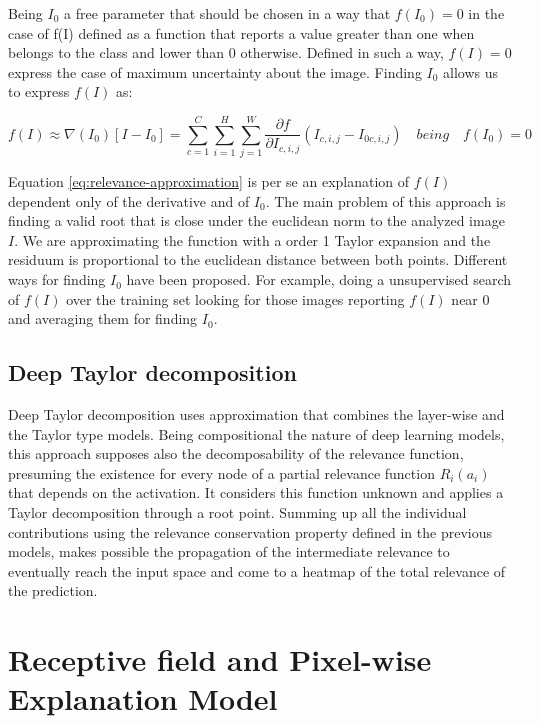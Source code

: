 \documentclass[preprint]{elsarticle}
\theoremstyle{definition} %
\theoremstyle{remark}
\begin{document}
Being $I_0$ a free parameter that should be chosen in a way that $f(I_0) = 0$ in the case of f(I) defined as a function that reports a value greater than one when belongs to the class and lower than 0 otherwise. Defined in such a way, $f(I) = 0$ express the case of maximum uncertainty about the image. Finding $I_0$ allows us to express $f(I)$ as:

\begin{equation}
f(I) \approx \nabla(I_0) [ I - I_0] = \sum_{c=1}^C \sum_{i=1}^{H} \sum_{j=1}^W \frac{\partial f}{\partial I_{c,i,j}}(I_{c,i,j} - I_{0 c, i, j}) \quad  being \quad f(I_0) = 0
\label{eq:relevance-approximation}
\end{equation}

Equation \ref{eq:relevance-approximation} is per se an explanation of $f(I)$ dependent only of the derivative and of $I_0$. The main problem of this approach is finding a valid root that is close under the euclidean norm to the analyzed image $I$. We are approximating the function with a order 1 Taylor expansion and the residuum is proportional to the euclidean distance between both points. Different ways for finding $I_0$ have been proposed. For example, doing a unsupervised search of $f(I)$ over the training set looking for those images reporting $f(I)$ near 0 and averaging them for finding $I_0$.

\subsection{Deep Taylor decomposition}

Deep Taylor decomposition \cite{montavon2017explaining} uses approximation that combines the layer-wise and the Taylor type models. Being compositional the nature of deep learning models, this approach supposes also the decomposability of the relevance function, presuming the existence for every node of a partial relevance function $R_i(a_i)$ that depends on the activation. It considers this function unknown and applies a Taylor decomposition through a root point. Summing up all the individual contributions using the relevance conservation property defined in the previous models, makes possible the propagation of the intermediate relevance to eventually reach the input space and come to a heatmap of the total relevance of the prediction. 

\section{Receptive field and Pixel-wise Explanation Model}\label{sec:math}
\end{document}
